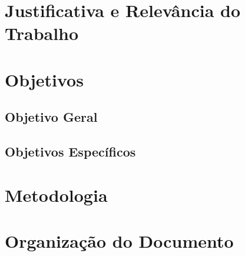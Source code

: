 \section{Justificativa e Relevância do Trabalho}
\label{sec:justificativa}


\section{Objetivos}
\label{sec:objetivos}

\subsection{Objetivo Geral}
\label{subsec:objGeral}

\subsection{Objetivos Específicos}
\label{subsec:objespecificos}


\section{Metodologia}
\label{sec:metodologia}


\section{Organização do Documento}
\label{sec:organizacao}